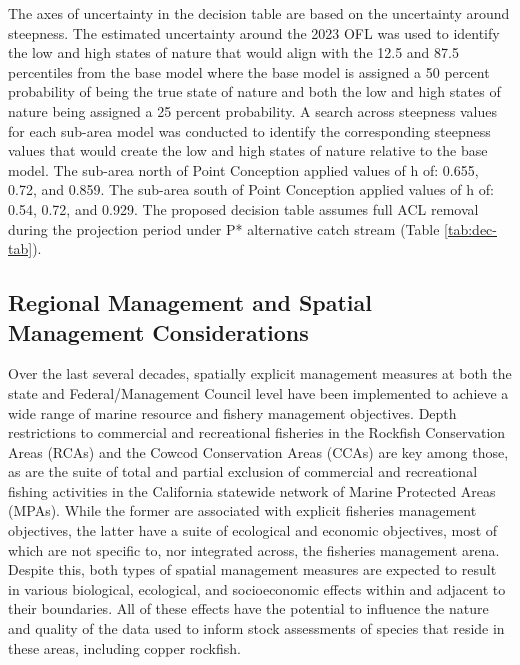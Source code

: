 \documentclass[11pt,
  english,
  letterpaper,
]{article}
\begin{document}
The axes of uncertainty in the decision table are based on the uncertainty around steepness. The estimated uncertainty around the 2023 OFL was used to identify the low and high states of nature that would align with the 12.5 and 87.5 percentiles from the base model where the base model is assigned a 50 percent probability of being the true state of nature and both the low and high states of nature being assigned a 25 percent probability. A search across steepness values for each sub-area model was conducted to identify the corresponding steepness values that would create the low and high states of nature relative to the base model. The sub-area north of Point Conception applied values of h of: 0.655, 0.72, and 0.859. The sub-area south of Point Conception applied values of h of: 0.54, 0.72, and 0.929. The proposed decision table assumes full ACL removal during the projection period under P* alternative catch stream (Table \ref{tab:dec-tab}).

\hypertarget{regional-management-and-spatial-management-considerations}{%
\subsection{Regional Management and Spatial Management Considerations}\label{regional-management-and-spatial-management-considerations}}

Over the last several decades, spatially explicit management measures at both the state and Federal/Management Council level have been implemented to achieve a wide range of marine resource and fishery management objectives. Depth restrictions to commercial and recreational fisheries in the Rockfish Conservation Areas (RCAs) and the Cowcod Conservation Areas (CCAs) are key among those, as are the suite of total and partial exclusion of commercial and recreational fishing activities in the California statewide network of Marine Protected Areas (MPAs). While the former are associated with explicit fisheries management objectives, the latter have a suite of ecological and economic objectives, most of which are not specific to, nor integrated across, the fisheries management arena. Despite this, both types of spatial management measures are expected to result in various biological, ecological, and socioeconomic effects within and adjacent to their boundaries. All of these effects have the potential to influence the nature and quality of the data used to inform stock assessments of species that reside in these areas, including copper rockfish.
\end{document}
